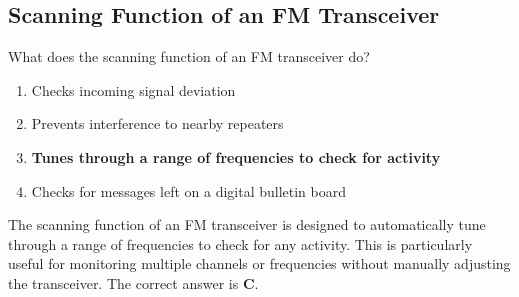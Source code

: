 \subsection{Scanning Function of an FM Transceiver}
\label{T4B05}

\begin{tcolorbox}[colback=gray!10!white,colframe=black!75!black,title=T4B05]
What does the scanning function of an FM transceiver do?
\begin{enumerate}[noitemsep]
    \item Checks incoming signal deviation
    \item Prevents interference to nearby repeaters
    \item \textbf{Tunes through a range of frequencies to check for activity}
    \item Checks for messages left on a digital bulletin board
\end{enumerate}
\end{tcolorbox}

The scanning function of an FM transceiver is designed to automatically tune through a range of frequencies to check for any activity. This is particularly useful for monitoring multiple channels or frequencies without manually adjusting the transceiver. The correct answer is \textbf{C}.